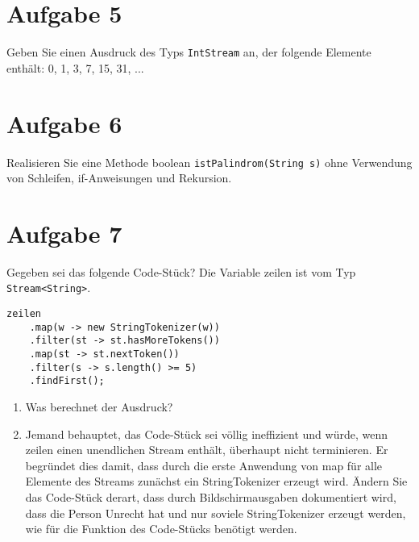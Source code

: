 \section{Aufgabe 5}
Geben Sie einen Ausdruck des Typs \lstinline{IntStream} an, der folgende Elemente enthält:
0, 1, 3, 7, 15, 31, ...

\section{Aufgabe 6}
Realisieren Sie eine Methode boolean \lstinline{istPalindrom(String s)} ohne Verwendung von
Schleifen, if-Anweisungen und Rekursion.

\section{Aufgabe 7}
Gegeben sei das folgende Code-Stück? Die Variable zeilen ist vom Typ
\lstinline{Stream<String>}.

\begin{lstlisting}
zeilen
    .map(w -> new StringTokenizer(w))
    .filter(st -> st.hasMoreTokens())
    .map(st -> st.nextToken())
    .filter(s -> s.length() >= 5)
    .findFirst();
\end{lstlisting}

\begin{enumerate}
    \item Was berechnet der Ausdruck?
    \item Jemand behauptet, das Code-Stück sei völlig ineffizient und würde, wenn zeilen
          einen unendlichen Stream enthält, überhaupt nicht terminieren. Er begründet
          dies damit, dass durch die erste Anwendung von map für alle Elemente des
          Streams zunächst ein StringTokenizer erzeugt wird. Ändern Sie das Code-Stück
          derart, dass durch Bildschirmausgaben dokumentiert wird, dass die Person
          Unrecht hat und nur soviele StringTokenizer erzeugt werden, wie für die
          Funktion des Code-Stücks benötigt werden.
\end{enumerate}